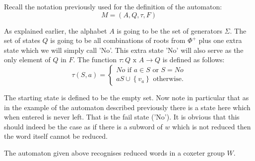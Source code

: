 \documentclass[a4paper,12pt]{article}
\begin{document}
Recall the notation previously used for the definition of the automaton:
\[M = (A, Q, \tau, F)\]

As explained earlier, the alphabet $A$ is going to be the set of generators $\Sigma$. The set of states $Q$ is going to be all combinations of roots from $\Phi^+$ plus one extra state which we will simply call 'No'. This extra state 'No' will also serve as the only element of $Q$ in $F$. The function $\tau: Q \text{ x } A \rightarrow Q$ is defined as follows:
\begin{equation*}
	\tau(S, a) = 
	\begin{cases}
		No \text{ if } a \in S \text{ or } S = No \\
		aS \cup \left\{v_a\right\} \text{ otherwise.}
	\end{cases}
\end{equation*}

The starting state is defined to be the empty set. Now note in particular that as in the example of the automaton described previously there is a state here which when entered is never left. That is the fail state ('No'). It is obvious that this should indeed be the case as if there is a subword of $w$ which is not reduced then the word itself cannot be reduced.

\begin{lem}
	The automaton given above recognises reduced words in a coxeter group $W$.
\end{lem}
\end{document}
